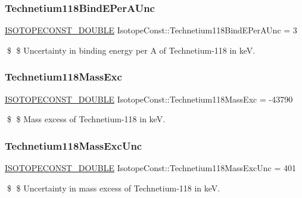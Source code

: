 \subsubsection{\texorpdfstring{Technetium118\+Bind\+E\+Per\+A\+Unc}{Technetium118BindEPerAUnc}}
{\footnotesize\ttfamily \mbox{\hyperlink{group___isotope_const-_macros_ga8f45a7272ce02c0b4c65c44636ed719a}{I\+S\+O\+T\+O\+P\+E\+C\+O\+N\+S\+T\+\_\+\+D\+O\+U\+B\+LE}} Isotope\+Const\+::\+Technetium118\+Bind\+E\+Per\+A\+Unc = 3}

\$ \$ Uncertainty in binding energy per A of Technetium-\/118 in keV. \mbox{\label{group___isotope_const-_technetium-_tc118_ga0d41f782e8a1d3b8fd9c2e5ec7beba72}} 
\subsubsection{\texorpdfstring{Technetium118\+Mass\+Exc}{Technetium118MassExc}}
{\footnotesize\ttfamily \mbox{\hyperlink{group___isotope_const-_macros_ga8f45a7272ce02c0b4c65c44636ed719a}{I\+S\+O\+T\+O\+P\+E\+C\+O\+N\+S\+T\+\_\+\+D\+O\+U\+B\+LE}} Isotope\+Const\+::\+Technetium118\+Mass\+Exc = -\/43790}

\$ \$ Mass excess of Technetium-\/118 in keV. \mbox{\label{group___isotope_const-_technetium-_tc118_ga81690209e8073e08bc13aac631ed6940}} 
\subsubsection{\texorpdfstring{Technetium118\+Mass\+Exc\+Unc}{Technetium118MassExcUnc}}
{\footnotesize\ttfamily \mbox{\hyperlink{group___isotope_const-_macros_ga8f45a7272ce02c0b4c65c44636ed719a}{I\+S\+O\+T\+O\+P\+E\+C\+O\+N\+S\+T\+\_\+\+D\+O\+U\+B\+LE}} Isotope\+Const\+::\+Technetium118\+Mass\+Exc\+Unc = 401}

\$ \$ Uncertainty in mass excess of Technetium-\/118 in keV. \mbox{\label{group___isotope_const-_technetium-_tc118_ga5a0b7763c74335ce7ab417349bcde0a8}} 
